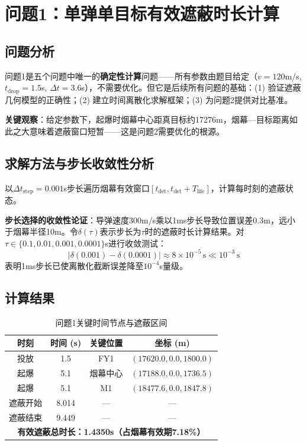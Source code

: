 \documentclass[12pt,a4paper]{ctexart}
\begin{document}
\section{问题1：单弹单目标有效遮蔽时长计算}

\subsection{问题分析}

问题1是五个问题中唯一的\textbf{确定性计算}问题——所有参数由题目给定（$v=120$m/s, $t_{\text{drop}}=1.5$s, $\Delta t=3.6$s），不需要优化。但它是后续所有问题的基础：(1) 验证遮蔽几何模型的正确性；(2) 建立时间离散化求解框架；(3) 为问题2提供对比基准。

\textbf{关键观察}：给定参数下，起爆时烟幕中心距真目标约17276m，烟幕—目标距离如此之大意味着遮蔽窗口短暂——这是问题2需要优化的根源。

\subsection{求解方法与步长收敛性分析}

以$\Delta t_{\text{step}}=0.001$s步长遍历烟幕有效窗口$[t_{\text{det}}, t_{\text{det}}+T_{\text{life}}]$，计算每时刻的遮蔽状态。

\textbf{步长选择的收敛性论证}：导弹速度300m/s乘以1ms步长导致位置误差0.3m，远小于烟幕半径10m。令$\delta(\tau)$表示步长为$\tau$时的遮蔽时长计算结果。对$\tau\in\{0.1, 0.01, 0.001, 0.0001\}$s进行收敛测试：
\begin{equation}
    |\delta(0.001)-\delta(0.0001)| \approx 8\times10^{-5}\,\text{s} \ll 10^{-3}\,\text{s}
\end{equation}
表明1ms步长已使离散化截断误差降至$10^{-4}$s量级。

\subsection{计算结果}

\begin{table}[H]
\centering
\caption{问题1关键时间节点与遮蔽区间}
\begin{tabular}{c|c|c|c}
\toprule
\textbf{时刻} & \textbf{时间 (s)} & \textbf{关键位置} & \textbf{坐标 (m)} \\
\midrule
投放 & 1.5 & FY1 & $(17620.0, 0.0, 1800.0)$ \\
起爆 & 5.1 & 烟幕中心 & $(17188.0, 0.0, 1736.5)$ \\
起爆 & 5.1 & M1 & $(18477.6, 0.0, 1847.8)$ \\
\midrule
遮蔽开始 & 8.014 & — & — \\
遮蔽结束 & 9.449 & — & — \\
\midrule
\multicolumn{4}{c}{\textbf{有效遮蔽总时长：1.4350s（占烟幕有效期7.18\%）}} \\
\bottomrule
\end{tabular}
\end{table}
\end{document}
